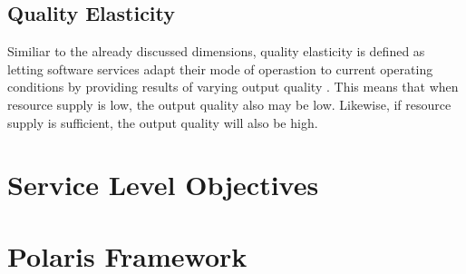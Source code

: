 \subsection{Quality Elasticity}

Similiar to the already discussed dimensions, quality elasticity is defined as letting software services adapt their mode of operastion to current operating conditions by providing results of varying output quality \cite{larssonQualityElasticityImprovedResource2019}. This means that when resource supply is low, the output quality also may be low. Likewise, if resource supply is sufficient, the output quality will also be high.

\section{Service Level Objectives}

\section{Polaris Framework}

